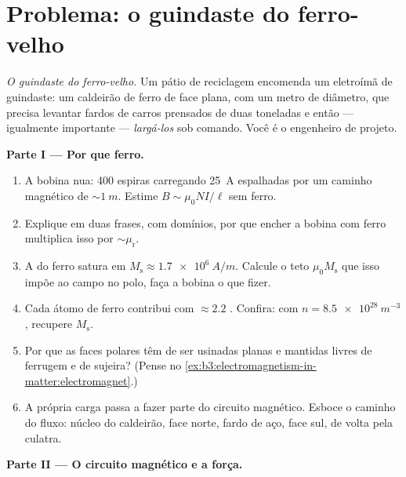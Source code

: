 \section{Problema: o guindaste do ferro-velho}

\begin{problem}\label{pb:b3:electromagnetism-in-matter:1}
\emph{O guindaste do ferro-velho.} Um pátio de reciclagem encomenda um
eletroímã de guindaste: um caldeirão de ferro de face plana, com um metro
de diâmetro, que precisa levantar fardos de carros prensados de duas
toneladas e então --- igualmente importante --- \emph{largá-los} sob
comando. Você é o engenheiro de projeto.

\medskip\noindent\textbf{Parte I --- Por que ferro.}

\begin{enumerate}
  \item A bobina nua: 400 espiras carregando \qty{25}{A} espalhadas
        por um caminho magnético de $\sim\qty{1}{m}$. Estime $B \sim
        \mu_0NI/\ell$ sem ferro.
  \item Explique em duas frases, com domínios, por que encher a
        bobina com ferro multiplica isso por $\sim\mu_{\text{r}}$.
  \item A  do ferro satura em $M_{\text{s}} \approx
        \qty{1.7e6}{A/m}$. Calcule o teto $\mu_0M_{\text{s}}$
        que isso impõe ao campo no polo, faça a bobina o que fizer.
  \item Cada átomo de ferro contribui com $\approx 2.2$ .
        Confira: com $n = \qty{8.5e28}{m^{-3}}$, recupere
        $M_{\text{s}}$.
  \item Por que as faces polares têm de ser usinadas planas e mantidas
        livres de ferrugem e de sujeira? (Pense no
        \cref{ex:b3:electromagnetism-in-matter:electromagnet}.)
  \item A própria carga passa a fazer parte do circuito magnético.
        Esboce o caminho do fluxo: núcleo do caldeirão, face norte, fardo
        de aço, face sul, de volta pela culatra.
\end{enumerate}

\medskip\noindent\textbf{Parte II --- O circuito magnético e a força.}


\end{problem}
